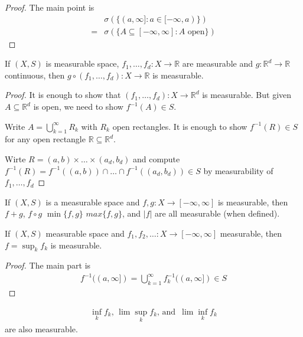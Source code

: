 \begin{proof}
	The main point is
	\begin{align*}
		&\sigma(\{(a,\infty] : a \in [-\infty, a)\}) \\
		= &\sigma(\{ A \subseteq [-\infty, \infty] : A \text{ open} \})
	\end{align*} 
\end{proof}

\begin{theorem}
	If $(X,S)$ is measurable space, 
	$f_1, \ldots, f_d : X \to \mathbb{R}$ are measurable and $g:\mathbb{R}^d \to \mathbb{R}$ continuous, then $g \circ (f_1, \ldots, f_d) : X \to \mathbb{R}$ is measurable.
\end{theorem}

\begin{proof}
	It is enough to show that $(f_1, \ldots, f_d) : X \to \mathbb{R}^d$ is measurable. But given $A \subseteq \mathbb{R}^d$ is open, we need to show $f^{-1}(A) \in S$.

	Write $A = \bigcup_{k=1}^{\infty} R_k$ with $R_k$ open rectangles. It is enough to show $f^{-1}(R) \in S$ for any open rectangle $\mathbb{R} \subseteq \mathbb{R}^d$.

	Wirte $R = (a,b) \times \ldots \times (a_d, b_d)$ and compute 
	$f^{-1}(R) =  f^{-1}((a,b)) \cap \ldots \cap f^{-1}((a_d, b_d)) \in S$
	by measurability of $f_1, \ldots , f_d$
\end{proof}

\begin{corollary}
	If $(X,S)$ is a measurable space and $f,g : X \to [-\infty, \infty]$ is measurable, 
	then $f+g$, $f\circ g$ $\min\{f,g\}$ $max\{f,g\}$, and $|f|$ are all measurable (when defined).
\end{corollary}

\begin{theorem}
	If $(X,S)$ measurable space and $f_1, f_2, \ldots : X \to [-\infty, \infty]$ measurable, then $f = \sup_k f_k$ is measurable.
\end{theorem}

\begin{proof}
	The main part is
	\begin{align*}
		f^{-1}((a, \infty]) = \bigcup_{k=1}^{\infty} f_k^{-1}((a,\infty]) \in S
	\end{align*}
\end{proof}

\begin{corollary}
	\begin{align*}
		\inf_k f_k, \, \lim \sup_k f_k, \, \text{and } \, \lim \inf_k f_k
	\end{align*} are also measurable.
\end{corollary}

